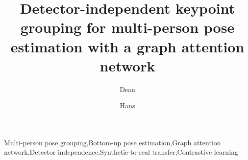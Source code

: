 \documentclass[times,twocolumn,final,authoryear]{elsarticle}
\begin{document}
\begin{frontmatter}

\title{Detector-independent keypoint grouping for multi-person pose estimation with a graph attention network}

\author[1]{Dean }
\author[1]{Hans }
\address[1]{Department of Electrical, Electronic and Computer Engineering, University of Pretoria, Pretoria, South Africa}


\begin{abstract}

\end{abstract}

\begin{keyword}
\KWD Multi-person pose grouping\sep Bottom-up pose estimation\sep Graph attention network\sep Detector independence\sep Synthetic-to-real transfer\sep Contrastive learning
\end{keyword}

\end{frontmatter}













\end{document}

